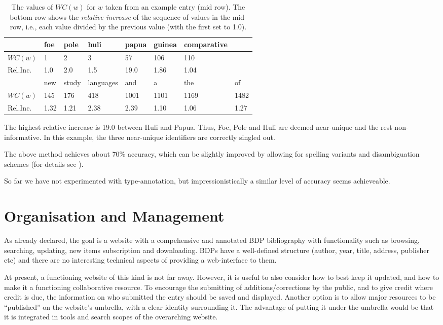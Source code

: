 \documentclass[english,11pt,twoside]{article}
\begin{document}
\begin{table*}[t]
\centering
\begin{tabular}{l|l|l|l|l|l|l|l|}
\hline
        & foe & pole & huli & papua & guinea & comparative\\ \hline
$WC(w)$ & 1   & 2    & 3    & 57    & 106    & 110\\ \hline
Rel.Inc.& 1.0 & 2.0  & 1.5  & 19.0  & 1.86   & 1.04\\ \hline\hline
        & new & study & languages & and & a & the & of\\ \hline
$WC(w)$ & 145 & 176 & 418 & 1001 & 1101 & 1169 & 1482\\ \hline
Rel.Inc.& 1.32 & 1.21 & 2.38 & 2.39 & 1.10 & 1.06 & 1.27\\ \hline
\end{tabular}
\caption{The values of $WC(w)$ for $w$ taken from an example entry (mid row).
  The bottom row shows the \emph{relative increase} of the sequence of values
  in the mid-row, i.e., each value divided by the previous value (with
  the first set to 1.0).}
\label{wc}
\end{table*}
The highest relative increase is 19.0 between Huli and Papua. Thus,
Foe, Pole and Huli are deemed near-unique and the rest
non-informative. In this example, the three near-unique identifiers
are correctly singled out.

The above method achieves about 70\% accuracy, which can be slightly
improved by allowing for spelling variants and disambiguation schemes
(for details see \citealt{cl:Hammarstrom:MMIES2}).

So far we have not experimented with type-annotation, but
impressionistically a similar level of accuracy seems achieveable.

\section{Organisation and Management}
As already declared, the goal is a website with a compehensive and
annotated BDP bibliography with functionality such as browsing,
searching, updating, new items subscription and downloading. BDPs
have a well-defined structure (author, year, title, address, publisher etc) and there are no interesting technical
aspects of providing a web-interface to them.

At present, a functioning website of this kind is not far away. However, it is
useful to also consider how to best keep it updated, and how to make
it a functioning collaborative resource. To encourage the submitting
of additions/corrections by the public, and to give credit where
credit is due, the information on who submitted the entry should be
saved and displayed. Another option is to allow major resources to be
``published'' on the website's umbrella, with a clear identity
surrounding it. The advantage of putting it under the umbrella would
be that it is integrated in tools and search scopes of the overarching
website.
\end{document}
